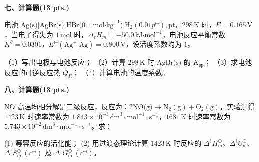 \vspace{0.5cm}
\noindent\textbf{七、计算题(13 pts.)}

电池 $\text{Ag(s)}|\text{AgBr(s)}|\text{HBr(0.1 mol·kg}^{-1})|\text{H}_2(0.01p^\ominus),\text{pt}$，$298\,\text{K}$ 时，$E=0.165\,\text{V}$，当电子得失为 $1\,\text{mol}$ 时，$\Delta_r H_m = -50.0\,\text{kJ·mol}^{-1}$，电池反应平衡常数 $K^\theta = 0.0301$，$E^\ominus(\text{Ag}^+|\text{Ag})=0.800\,\text{V}$，设活度系数均为 $1$。

（1）写出电极与电池反应；
（2）计算 $298\,\text{K}$ 时 $\text{AgBr(s)}$ 的 $K_{\text{sp}}$；
（3）求电池反应的可逆反应热 $Q_R$；
（4）计算电池的温度系数。

\vspace{0.5cm}
\noindent\textbf{八、计算题(13 pts.)}

$\text{NO}$ 高温均相分解是二级反应，反应为：$2\text{NO(g)}\rightarrow\text{N}_2(\text{g})+\text{O}_2(\text{g})$，实验测得 $1423\,\text{K}$ 时速率常数为 $1.843\times 10^{-3}\,\text{dm}^3\cdot\text{mol}^{-1}\cdot\text{s}^{-1}$，$1681\,\text{K}$ 时速率常数为 $5.743\times 10^{-2}\,\text{dm}^3\cdot\text{mol}^{-1}\cdot\text{s}^{-1}$。求：

(1) 等容反应的活化能；
(2) 用过渡态理论计算 $1423\,\text{K}$ 时反应的 $\Delta^\ddagger H_\text{m}^\ominus$、$\Delta^\ddagger U_\text{m}^\ominus$、$\Delta^\ddagger S_\text{m}^\ominus\ (c^\ominus)$ 及 $\Delta^\ddagger G_\text{m}^\ominus\ (c^\ominus)$。